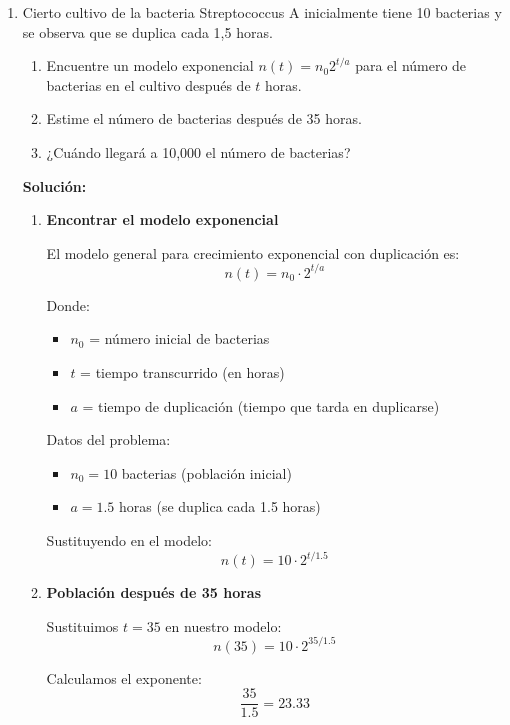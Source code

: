 \documentclass[12pt]{article}
\begin{document}
\begin{enumerate}[label=\alph*.-]
    \item Cierto cultivo de la bacteria Streptococcus A inicialmente tiene 10 bacterias y se observa que se duplica cada 1,5 horas.
    \begin{enumerate}[label=\roman*.]
        \item Encuentre un modelo exponencial $n(t) = n_0 2^{t/a}$ para el número de bacterias en el cultivo después de $t$ horas.
        \item Estime el número de bacterias después de 35 horas.
        \item ¿Cuándo llegará a 10,000 el número de bacterias?
    \end{enumerate}
    
    \textbf{Solución:}
    
    \begin{enumerate}[label=\roman*.]
        \item \textbf{Encontrar el modelo exponencial}
        
        El modelo general para crecimiento exponencial con duplicación es:
        \[n(t) = n_0 \cdot 2^{t/a}\]
        
        Donde:
        \begin{itemize}
            \item $n_0$ = número inicial de bacterias
            \item $t$ = tiempo transcurrido (en horas)
            \item $a$ = tiempo de duplicación (tiempo que tarda en duplicarse)
        \end{itemize}
        
        Datos del problema:
        \begin{itemize}
            \item $n_0 = 10$ bacterias (población inicial)
            \item $a = 1.5$ horas (se duplica cada 1.5 horas)
        \end{itemize}
        
        Sustituyendo en el modelo:
        \[\boxed{n(t) = 10 \cdot 2^{t/1.5}}\]
        
        \item \textbf{Población después de 35 horas}
        
        Sustituimos $t = 35$ en nuestro modelo:
        \[n(35) = 10 \cdot 2^{35/1.5}\]
        
        Calculamos el exponente:
        \[\frac{35}{1.5} = 23.33\]
        

\end{enumerate}
\end{enumerate}
\end{document}
